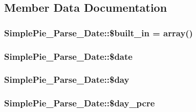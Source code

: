 \subsection{Member Data Documentation}
\hypertarget{class_simple_pie___parse___date_aa9fe682db7921d8dd6d2cbb4c1ff36b5}{
\subsubsection[{\$built\-\_\-in}]{\setlength{\rightskip}{0pt plus 5cm}Simple\-Pie\-\_\-\-Parse\-\_\-\-Date\-::\$built\-\_\-in = array()}}\label{class_simple_pie___parse___date_aa9fe682db7921d8dd6d2cbb4c1ff36b5}
\hypertarget{class_simple_pie___parse___date_a99b02dcc8d5238e69cfd2eec820f36b6}{
\subsubsection[{\$date}]{\setlength{\rightskip}{0pt plus 5cm}Simple\-Pie\-\_\-\-Parse\-\_\-\-Date\-::\$date}}\label{class_simple_pie___parse___date_a99b02dcc8d5238e69cfd2eec820f36b6}
\hypertarget{class_simple_pie___parse___date_a8ae759664647069794309d7fb0882448}{
\subsubsection[{\$day}]{\setlength{\rightskip}{0pt plus 5cm}Simple\-Pie\-\_\-\-Parse\-\_\-\-Date\-::\$day}}\label{class_simple_pie___parse___date_a8ae759664647069794309d7fb0882448}
\hypertarget{class_simple_pie___parse___date_a5a3779d94b807f380a55ce3ab096fe50}{
\subsubsection[{\$day\-\_\-pcre}]{\setlength{\rightskip}{0pt plus 5cm}Simple\-Pie\-\_\-\-Parse\-\_\-\-Date\-::\$day\-\_\-pcre}}\label{class_simple_pie___parse___date_a5a3779d94b807f380a55ce3ab096fe50}
